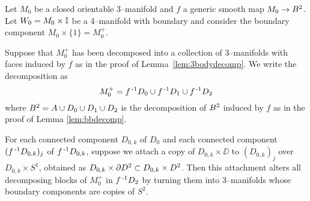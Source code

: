 \begin{lem}
	\label{lem:3body2handlept2}
	Let $M_0$ be a closed orientable 3--manifold and $f$ a generic smooth map $M_0\to B^2$.
	Let $W_0=M_0\times\mathbb{I}$ be a 4--manifold with boundary and consider the boundary component $M_0\times\{1\}=M_0^+$.
	
	Suppose that $M_0^+$ has been decomposed into a collection of 3--manifolds with faces induced by $f$ as in the proof of Lemma~\ref{lem:3bodydecomp}.
	We write the decomposition as
	\[
		M_0^+ = f^{\,\text{-}1} D_0\cup f^{\,\text{-}1} D_1\cup f^{\,\text{-}1} D_2
	\]
	where $B^2=A\cup D_0\cup D_1\cup D_2$ is the decomposition of $B^2$ induced by $f$ as in the proof of Lemma \ref{lem:bbdecomp}.
	
	For each connected component $D_{0,k}$ of $D_0$ and each connected component $(f^{\,\text{-}1} D_{0,k})_j$ of $f^{\,\text{-}1} D_{0,k}$, suppose we attach a copy of $D_{0,k}\times\DD$ to $(D_{0,k})_j$ over $D_{0,k}\times S^1$, obtained as $D_{0,k}\times \partial D^2\subset D_{0,k}\times D^2$.
	Then this attachment alters all decomposing blocks of $M_0^+$ in $f^{\,\text{-}1} D_2$ by turning them into 3--manifolds whose boundary components are copies of $S^2$.
\end{lem}

